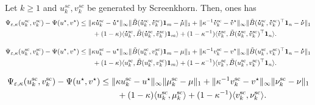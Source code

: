 \begin{proposition}
Let $k\geq 1$ and $u^{sc}_k, v^{sc}_k$ be generated by Screenkhorn. Then, ones has 
\begin{align*}
\Psi_{\varepsilon, \kappa}(u^{\text{sc}}_k ,v^{\text{sc}}_k) -\Psi(u^\star, v^\star)
&\leq \norm{\kappa \dt{u}^{\text{sc}}_k - \dt{u}^\star}_\infty \norm{\tilde{B}(\dt{u}^{\text{sc}}_k ,\dt{v}^{\text{sc}}_k)\mathbf 1_m - \dt{\mu}}_1 + \norm{\kappa^{-1}\dt{v}^{\text{sc}}_k - \dt{v}^\star}_\infty \norm{\tilde{B}(\dt{u}^{\text{sc}}_k ,\dt{v}^{\text{sc}}_k)^\top\mathbf 1_n - \dt{\nu}}_1\\
&\qquad + (1- \kappa)\inr{\dt{u}^{\text{sc}}_k ,\tilde{B}(\dt{u}^{\text{sc}}_k ,\dt{v}^{\text{sc}}_k)\mathbf 1_m} + (1- \kappa^{-1})\inr{\dt{v}^{\text{sc}}_k ,\tilde{B}(\dt{u}^{\text{sc}}_k ,\dt{v}^{\text{sc}}_k)^\top\mathbf 1_n}.
\end{align*}

\begin{align*}
\Psi_{\varepsilon, \kappa}(u^{\text{sc}}_k ,v^{\text{sc}}_k) -\Psi(u^\star, v^\star)
&\leq \norm{\kappa {u}^{\text{sc}}_k - {u}^\star}_\infty \norm{\tilde{B}({u}^{\text{sc}}_k ,{v}^{\text{sc}}_k)\mathbf 1_m - {\mu}}_1 + \norm{\kappa^{-1}{v}^{\text{sc}}_k - {v}^\star}_\infty \norm{\tilde{B}({u}^{\text{sc}}_k ,{v}^{\text{sc}}_k)^\top\mathbf 1_n - \dt{\nu}}_1\\
&\qquad + (1- \kappa)\inr{{u}^{\text{sc}}_k ,\tilde{B}({u}^{\text{sc}}_k ,{v}^{\text{sc}}_k)\mathbf 1_m} + (1- \kappa^{-1})\inr{{v}^{\text{sc}}_k ,\tilde{B}({u}^{\text{sc}}_k ,{v}^{\text{sc}}_k)^\top\mathbf 1_n}.
\end{align*}

\newpage
\begin{align*}
\Psi_{\varepsilon, \kappa}(u^{\text{sc}}_k ,v^{\text{sc}}_k) -\Psi(u^\star, v^\star)
&\leq \|\kappa {u}^{\text{sc}}_k - {u}^\star\|_\infty \|\mu ^{\text{sc}}_k- {\mu}\|_1 + \|\kappa^{-1}{v}^{\text{sc}}_k - {v}^\star\|_\infty \|\nu^{\text{sc}}_k - {\nu}\|_1\\
&\qquad + (1- \kappa)\langle {u}^{\text{sc}}_k ,\mu ^{\text{sc}}_k \rangle + (1- \kappa^{-1})\langle {v}^{\text{sc}}_k ,\nu ^{\text{sc}}_k \rangle.
\end{align*}

\end{proposition}

